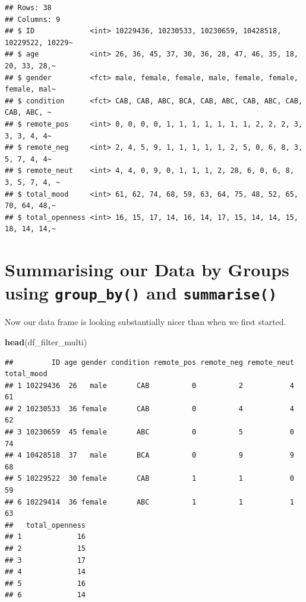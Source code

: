 \documentclass[
]{book}
\newenvironment{Shaded}{\begin{snugshade}}{\end{snugshade}}
\newcommand{\FunctionTok}[1]{\textcolor[rgb]{0.13,0.29,0.53}{\textbf{#1}}}
\newcommand{\NormalTok}[1]{#1}
\begin{document}
\begin{verbatim}
## Rows: 38
## Columns: 9
## $ ID             <int> 10229436, 10230533, 10230659, 10428518, 10229522, 10229~
## $ age            <int> 26, 36, 45, 37, 30, 36, 28, 47, 46, 35, 18, 20, 33, 28,~
## $ gender         <fct> male, female, female, male, female, female, female, mal~
## $ condition      <fct> CAB, CAB, ABC, BCA, CAB, ABC, CAB, ABC, CAB, CAB, ABC, ~
## $ remote_pos     <int> 0, 0, 0, 0, 1, 1, 1, 1, 1, 1, 1, 2, 2, 2, 3, 3, 3, 4, 4~
## $ remote_neg     <int> 2, 4, 5, 9, 1, 1, 1, 1, 1, 2, 5, 0, 6, 8, 3, 5, 7, 4, 4~
## $ remote_neut    <int> 4, 4, 0, 9, 0, 1, 1, 1, 2, 28, 6, 0, 6, 8, 3, 5, 7, 4, ~
## $ total_mood     <int> 61, 62, 74, 68, 59, 63, 64, 75, 48, 52, 65, 70, 64, 48,~
## $ total_openness <int> 16, 15, 17, 14, 16, 14, 17, 15, 14, 14, 15, 18, 14, 14,~
\end{verbatim}

\hypertarget{summarising-our-data-by-groups-using-group_by-and-summarise}{%
\section{\texorpdfstring{Summarising our Data by Groups using \texttt{group\_by()} and \texttt{summarise()}}{Summarising our Data by Groups using group\_by() and summarise()}}\label{summarising-our-data-by-groups-using-group_by-and-summarise}}

Now our data frame is looking substantially nicer than when we first started.

\begin{Shaded}
\begin{Highlighting}[]
\FunctionTok{head}\NormalTok{(df\_filter\_multi)}
\end{Highlighting}
\end{Shaded}

\begin{verbatim}
##         ID age gender condition remote_pos remote_neg remote_neut total_mood
## 1 10229436  26   male       CAB          0          2           4         61
## 2 10230533  36 female       CAB          0          4           4         62
## 3 10230659  45 female       ABC          0          5           0         74
## 4 10428518  37   male       BCA          0          9           9         68
## 5 10229522  30 female       CAB          1          1           0         59
## 6 10229414  36 female       ABC          1          1           1         63
##   total_openness
## 1             16
## 2             15
## 3             17
## 4             14
## 5             16
## 6             14
\end{verbatim}
\end{document}
